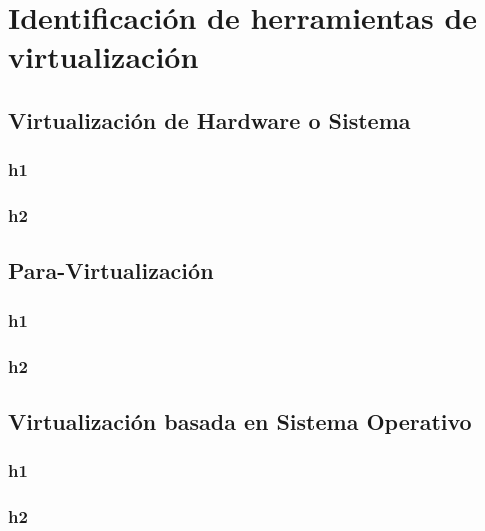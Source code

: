 \section{Identificación de herramientas de virtualización} \label{herramientas}


\subsection{Virtualización de Hardware o Sistema}
\subsubsection{h1}
\subsubsection{h2}

\subsection{Para-Virtualización}
\subsubsection{h1}
\subsubsection{h2}

\subsection{Virtualización basada en Sistema Operativo}
\subsubsection{h1}
\subsubsection{h2}
